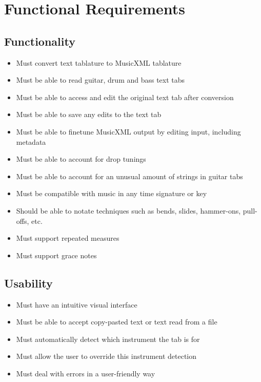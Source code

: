 \documentclass[11pt]{article}
\date{\today}
\title{}
\begin{document}
\tableofcontents

\newpage
\section{Functional Requirements}
\label{sec:org9ae3d05}
\subsection{Functionality}
\label{sec:orgbaf7ecc}
\begin{itemize}
\item Must convert text tablature to MusicXML tablature
\item Must be able to read guitar, drum and bass text tabs
\item Must be able to access and edit the original text tab after conversion
\item Must be able to save any edits to the text tab
\item Must be able to finetune MusicXML output by editing input, including metadata
\item Must be able to account for drop tunings
\item Must be able to account for an unusual amount of strings in guitar tabs
\item Must be compatible with music in any time signature or key
\item Should be able to notate techniques such as bends, slides, hammer-ons, pull-offs, etc.
\item Must support repeated measures
\item Must support grace notes
\end{itemize}

\subsection{Usability}
\label{sec:org760bd57}
\begin{itemize}
\item Must have an intuitive visual interface
\item Must be able to accept copy-pasted text or text read from a file
\item Must automatically detect which instrument the tab is for
\item Must allow the user to override this instrument detection
\item Must deal with errors in a user-friendly way
\end{itemize}
\end{document}
